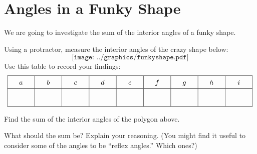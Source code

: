 \newpage
\section{Angles in a Funky Shape} 

We are going to investigate the sum of the interior angles of a
funky shape.

\begin{prob}
Using a protractor, measure the interior angles of the crazy shape below:
\vspace{0.1in}
\[
\texttt{[image: ../graphics/funkyshape.pdf]}
\]
Use this table to record your findings:
\[
\vspace{0.1in}
{\renewcommand{\arraystretch}{1.5}
\begin{array}{|c|c|c|c|c|c|c|c|c|}\hline
a & b & c & d & e & f & g & h & i \\\hline
\rule[7mm]{10mm}{0mm}  & \rule[7mm]{10mm}{0mm}    & \rule[7mm]{10mm}{0mm}   & \rule[7mm]{10mm}{0mm}   &  \rule[7mm]{10mm}{0mm}   & \rule[7mm]{10mm}{0mm}    & \rule[7mm]{10mm}{0mm}   & \rule[7mm]{10mm}{0mm}   & \rule[7mm]{10mm}{0mm}   \\ \hline
\end{array}}
\]
\end{prob}

\begin{prob}
Find the sum of the interior angles of the polygon above. 
\end{prob}


\begin{prob}
What should the sum be? Explain your reasoning.  
(You might find it useful to consider some of the angles to be ``reflex angles.''  Which ones?)  
\end{prob}


